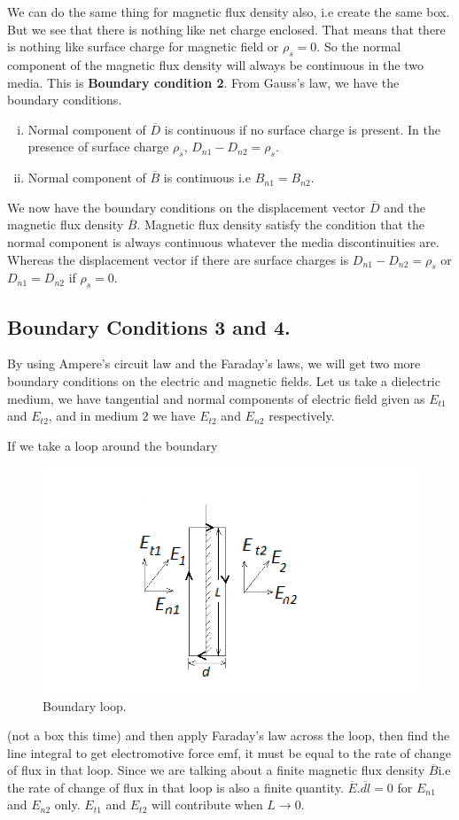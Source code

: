 We can do the same thing for magnetic flux density also, i.e create the same box. But we see that there is nothing like net charge enclosed. That means that there is nothing like surface charge for magnetic field or $\rho_s = 0$. So the normal component of the magnetic flux density will always be continuous in the two media. This is \textbf{Boundary condition 2}. From Gauss's law, we have the boundary conditions.
\begin{enumerate}[(i)]
\item Normal component of $\overline{D}$ is continuous if no surface charge is present. In the presence of surface charge $\rho_s$, $D_{n1}- D_{n2} = \rho_s$.
\item Normal component of $\overline{B}$ is continuous i.e $B_{n1} = B_{n2}$.
\end{enumerate}

We now have the boundary conditions on the displacement vector $\overline{D}$ and the magnetic flux density $\overline{B}$. Magnetic flux density satisfy the condition that the normal component is always continuous whatever the media discontinuities are. Whereas the displacement vector if there are surface charges  is $D_{n1}- D_{n2} = \rho_s$ or $D_{n1} = D_{n2} $ if $\rho_s = 0$. 
\subsection{Boundary Conditions 3 and 4.}
By using Ampere's circuit law and the Faraday's laws, we will get two more boundary conditions on the electric and magnetic fields. Let us take a dielectric medium, we have tangential and normal components of electric field given as $E_{t1}$ and $E_{t2}$, and in medium 2 we have $E_{t2}$ and $E_{n2}$ respectively.

If we take a loop around the boundary
\begin{figure}[h]
\centering
\includegraphics[width=1\linewidth]{./graphics/diemedium4}
\caption{Boundary loop.}
\end{figure}
(not a box this time) and then apply Faraday's law across the loop, then find the line integral to get electromotive force emf, it must be equal to the rate of change of flux in that loop. Since we are talking about a finite magnetic flux density $\overline{B}$i.e the rate of change of flux in that loop is also a finite quantity. $\overline{E}.\overline{dl} = 0$ for $E_{n1}$ and $E_{n2}$ only. $E_{t1}$ and $E_{t2}$ will contribute when $L \longrightarrow 0$. 

